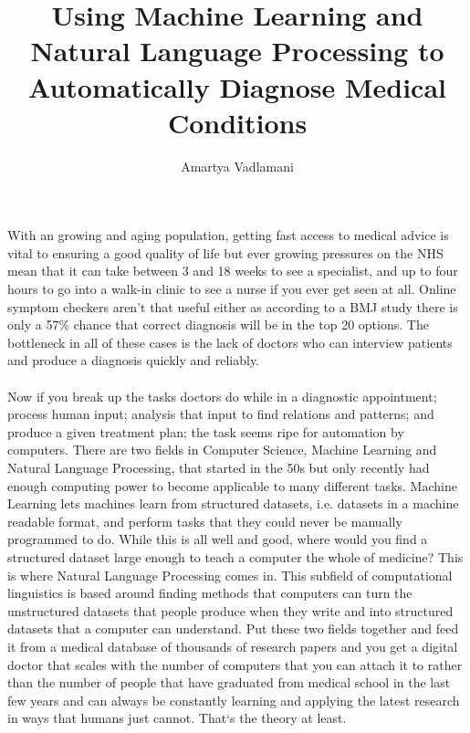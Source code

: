 \documentclass{article}
\author{Amartya Vadlamani}
\title{Using Machine Learning and Natural Language Processing to Automatically Diagnose Medical Conditions}
\date{}
\begin{document}
\maketitle
{}

\paragraph {}
With an growing and aging population, getting fast access to medical advice is
vital to ensuring a good quality of life but ever growing pressures on the NHS
mean that it can take between 3 and 18 weeks to see a
specialist\cite{referaltime}, and up to four hours to go into a walk-in clinic
to see a nurse if you ever get seen at all\cite{appointmentwait}. Online
symptom checkers aren't that useful either as according to a BMJ study there is
only a 57\% chance that correct diagnosis will be in the top 20
options\cite{webMD}. The bottleneck in all of these cases is the lack of
doctors who can interview patients and produce a diagnosis quickly and reliably.

\paragraph{}
Now if you break up the tasks doctors do while in a diagnostic appointment;
process human input; analysis that input to find relations and patterns; and
produce a given treatment plan; the task seems ripe for automation by
computers. There are two fields in Computer Science, Machine Learning and
Natural Language Processing, that started in the 50s but only recently had
enough computing power to become applicable to many different tasks. Machine
Learning lets machines learn from structured datasets, i.e.  datasets in a
machine readable format, and perform tasks that they could never be manually
programmed to do.\cite{whatiswatson} While this is all well and good, where
would you find a structured dataset large enough to teach a computer the whole
of medicine? This is where Natural Language Processing comes in. This subfield
of computational linguistics is based around finding methods that computers can
turn the unstructured datasets that people produce when they write and into
structured datasets that a computer can understand.\cite{whatiswatson} Put
these two fields together and feed it from a medical database of thousands of
research papers and you get a digital doctor that scales with the number of
computers that you can attach it to rather than the number of people that have
graduated from medical school in the last few years and can always be
constantly learning and applying the latest research in ways that humans just
cannot. That`s the theory at least.
\end{document}
